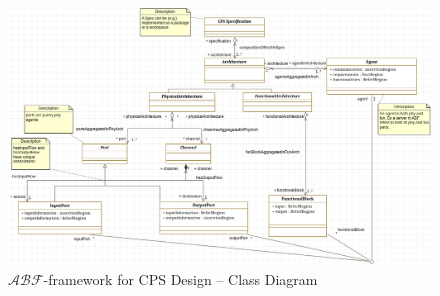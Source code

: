 \documentclass[runningheads]{llncs}
\newcommand{\assertionRegion}{\mathcal{A}}
\newcommand{\beliefRegion}{\mathcal{B}}
\newcommand{\factRegion}{\mathcal{F}}
\newcommand{\abftheory}{\assertionRegion\beliefRegion\factRegion}
\begin{document}
\begin{figure}
	\centering
	\includegraphics[width=\textwidth]{secra_classDiagram.png}
	\caption{$\abftheory$-framework for CPS Design -- Class Diagram}
	\label{fig:secraclassdiagram}
\end{figure}
\end{document}
